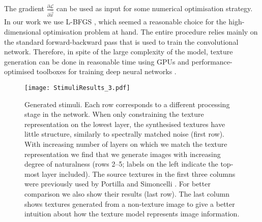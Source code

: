 \documentclass{article} %
\begin{document}
The gradient $\frac{\partial\mathcal{L}}{\partial\hat{\vec{x}}}$ can be used as input for some numerical optimisation strategy. In our work we use L-BFGS \cite{zhu_algorithm_1997}, which seemed a reasonable choice for the high-dimensional optimisation problem at hand. 
The entire procedure relies mainly on the standard forward-backward pass that is used to train the convolutional network. Therefore, in spite of the large complexity of the model, texture generation can be done in reasonable time using GPUs and performance-optimised toolboxes for training deep neural networks \cite{jia_caffe:_2014}.

\begin{figure}[]
\begin{center}
\texttt{[image: StimuliResults\_3.pdf]}%
\end{center}
\caption{\label{generated}Generated stimuli. Each row corresponds to a different processing stage in the network. When only constraining the texture representation on the lowest layer, the synthesised textures have little structure, similarly to spectrally matched noise (first row). With increasing number of layers on which we match the texture representation we find that we generate images with increasing degree of naturalness (rows 2--5; labels on the left indicate the top-most layer included). The source textures in the first three columns were previously used by Portilla and Simoncelli \cite{portilla_parametric_2000}. For better comparison we also show their results (last row). The last column shows textures generated from a non-texture image to give a better intuition about how the texture model represents image information.}
\end{figure}
\end{document}
